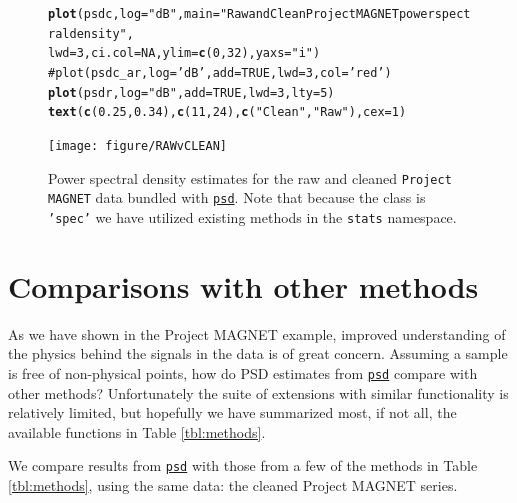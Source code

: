 \documentclass{article}\usepackage{graphicx, color}
\makeatletter
\newcommand{\hlfunctioncall}[1]{\textcolor[rgb]{0.501960784313725,0,0.329411764705882}{\textbf{#1}}}%
\newcommand{\hlstring}[1]{\textcolor[rgb]{0.6,0.6,1}{#1}}%
\newcommand{\hlcomment}[1]{\textcolor[rgb]{0.180392156862745,0.6,0.341176470588235}{#1}}%
\newenvironment{kframe}{%
 \def\at@end@of@kframe{}%
 \ifinner\ifhmode%
  \def\at@end@of@kframe{\end{minipage}}%
  \begin{minipage}{\columnwidth}%
 \fi\fi%
 \def\FrameCommand##1{\hskip\@totalleftmargin \hskip-\fboxsep
 \colorbox{shadecolor}{##1}\hskip-\fboxsep
     \hskip-\linewidth \hskip-\@totalleftmargin \hskip\columnwidth}%
 \MakeFramed {\advance\hsize-\width
   \@totalleftmargin\z@ \linewidth\hsize
   \@setminipage}}%
 {\par\unskip\endMakeFramed%
 \at@end@of@kframe}
\newenvironment{knitrout}{}{} %
\newcommand{\Rcmd}[1]{\texttt{#1}}
\newcommand{\psd}[0]{\href{http://abarbour.github.com/psd/}{\color{blue}\Rcmd{psd}}}
\makeatother
\begin{document}
%
\begin{figure}[htb!]
\begin{center}
\begin{knitrout}
\color{fgcolor}\begin{kframe}
\begin{alltt}
\hlfunctioncall{plot}(psdc, log = \hlstring{"dB"}, main = \hlstring{"Raw and Clean Project MAGNET power spectral density"}, 
    lwd = 3, ci.col = NA, ylim = \hlfunctioncall{c}(0, 32), yaxs = \hlstring{"i"})
\hlcomment{# plot(psdc_ar, log='dB', add=TRUE, lwd=3, col='red')}
\hlfunctioncall{plot}(psdr, log = \hlstring{"dB"}, add = TRUE, lwd = 3, lty = 5)
\hlfunctioncall{text}(\hlfunctioncall{c}(0.25, 0.34), \hlfunctioncall{c}(11, 24), \hlfunctioncall{c}(\hlstring{"Clean"}, \hlstring{"Raw"}), cex = 1)
\end{alltt}
\end{kframe}
\texttt{[image: figure/RAWvCLEAN]} 

\end{knitrout}

\caption{Power spectral density estimates for the raw and cleaned
             \Rcmd{Project MAGNET} data bundled with \psd{}. Note that
             because the class is \Rcmd{'spec'} we have
             utilized  existing methods in the \Rcmd{stats} namespace.}
\label{fig:pmag}
\end{center}
\end{figure}

\section{Comparisons with other methods}

As we have shown in the Project MAGNET example, 
improved understanding of the physics behind the signals in the data
is of great concern.
Assuming a sample is free of non-physical points, how do
PSD estimates from \psd{}
compare with other methods?
Unfortunately the suite of extensions with similar functionality
is relatively limited, but hopefully we have
summarized most, if not all, the available functions in Table \ref{tbl:methods}.



We compare results from
\psd{} with those from a few of the methods in Table \ref{tbl:methods},
using the same data: the cleaned Project MAGNET series.
\end{document}
